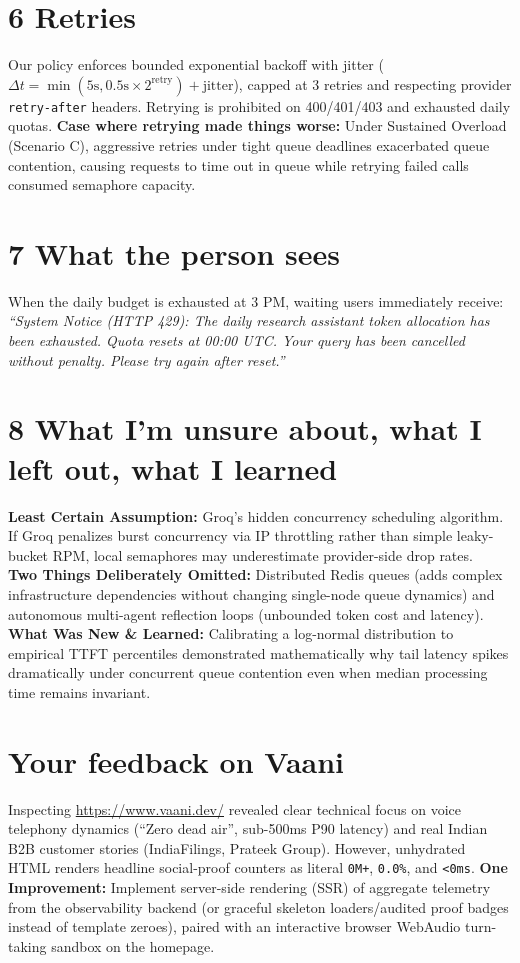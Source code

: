 \documentclass[9pt]{article}
\begin{document}
\section{6 \quad Retries}
Our policy enforces bounded exponential backoff with jitter ($\Delta t = \min(5\text{s}, 0.5\text{s} \times 2^{\text{retry}}) + \text{jitter}$), capped at 3 retries and respecting provider \texttt{retry-after} headers. Retrying is prohibited on 400/401/403 and exhausted daily quotas.
\textbf{Case where retrying made things worse:} Under Sustained Overload (Scenario C), aggressive retries under tight queue deadlines exacerbated queue contention, causing requests to time out in queue while retrying failed calls consumed semaphore capacity.

\section{7 \quad What the person sees}
When the daily budget is exhausted at 3 PM, waiting users immediately receive:
\textit{``System Notice (HTTP 429): The daily research assistant token allocation has been exhausted. Quota resets at 00:00 UTC. Your query has been cancelled without penalty. Please try again after reset.''}

\section{8 \quad What I'm unsure about, what I left out, what I learned}
\textbf{Least Certain Assumption:} Groq's hidden concurrency scheduling algorithm. If Groq penalizes burst concurrency via IP throttling rather than simple leaky-bucket RPM, local semaphores may underestimate provider-side drop rates.\\
\textbf{Two Things Deliberately Omitted:} Distributed Redis queues (adds complex infrastructure dependencies without changing single-node queue dynamics) and autonomous multi-agent reflection loops (unbounded token cost and latency).\\
\textbf{What Was New \& Learned:} Calibrating a log-normal distribution to empirical TTFT percentiles demonstrated mathematically why tail latency spikes dramatically under concurrent queue contention even when median processing time remains invariant.

\section*{Your feedback on Vaani}
Inspecting \url{https://www.vaani.dev/} revealed clear technical focus on voice telephony dynamics (``Zero dead air'', sub-500ms P90 latency) and real Indian B2B customer stories (IndiaFilings, Prateek Group). However, unhydrated HTML renders headline social-proof counters as literal \texttt{0M+}, \texttt{0.0\%}, and \texttt{<0ms}. \textbf{One Improvement:} Implement server-side rendering (SSR) of aggregate telemetry from the observability backend (or graceful skeleton loaders/audited proof badges instead of template zeroes), paired with an interactive browser WebAudio turn-taking sandbox on the homepage.
\end{document}
